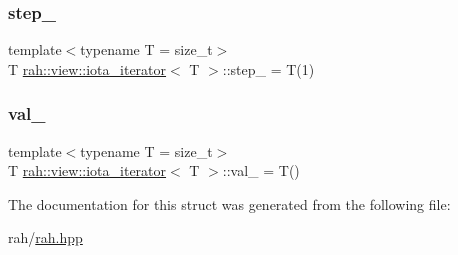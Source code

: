 \subsubsection{\texorpdfstring{step\_}{step\_}}
{\footnotesize\ttfamily template$<$typename T  = size\+\_\+t$>$ \\
T \mbox{\hyperlink{structrah_1_1view_1_1iota__iterator}{rah\+::view\+::iota\+\_\+iterator}}$<$ T $>$\+::step\+\_\+ = T(1)}

\mbox{\label{structrah_1_1view_1_1iota__iterator_a7a2ef77dc1a09b2eea42804c2297d057}} 
\subsubsection{\texorpdfstring{val\_}{val\_}}
{\footnotesize\ttfamily template$<$typename T  = size\+\_\+t$>$ \\
T \mbox{\hyperlink{structrah_1_1view_1_1iota__iterator}{rah\+::view\+::iota\+\_\+iterator}}$<$ T $>$\+::val\+\_\+ = T()}



The documentation for this struct was generated from the following file\+:\begin{DoxyCompactItemize}
\item 
rah/\mbox{\hyperlink{rah_8hpp}{rah.\+hpp}}\end{DoxyCompactItemize}
